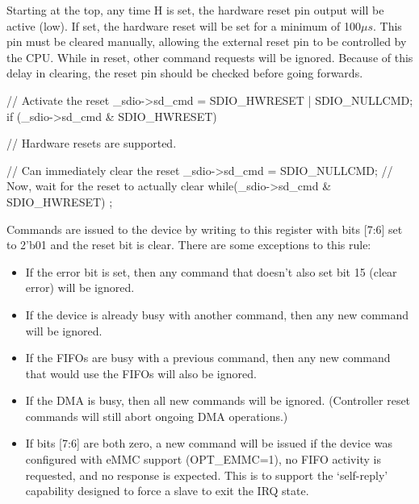 \documentclass{gqtekspec}
\begin{document}
Starting at the top, any time H is set, the hardware
reset pin output will be active (low).  If set, the hardware reset will be set
for a minimum of 100$\mu s$.  This pin must be cleared manually, allowing
the external reset pin to be controlled by the CPU.  While in reset, other
command requests will be ignored.  Because of this delay in clearing, the
reset pin should be checked before going forwards.

\begin{zCpp}
	// Activate the reset
	_sdio->sd_cmd = SDIO_HWRESET | SDIO_NULLCMD;
	if (_sdio->sd_cmd & SDIO_HWRESET) {
		// Hardware resets are supported.

		// Can immediately clear the reset
		_sdio->sd_cmd = SDIO_NULLCMD;
		// Now, wait for the reset to actually clear
		while(_sdio->sd_cmd & SDIO_HWRESET)
			;
	}
\end{zCpp}

Commands are issued to the device by writing to this register with bits [7:6]
set to 2'b01 and the reset bit is clear.  There are some exceptions to this
rule:
\begin{itemize}
\item If the error bit is set, then any command that doesn't also set bit 15
	(clear error) will be ignored.
\item If the device is already busy with another command, then any new command
	will be ignored.
\item If the FIFOs are busy with a previous command, then any new command that
	would use the FIFOs will also be ignored.
\item If the DMA is busy, then all new commands will be ignored.  (Controller
	reset commands will still abort ongoing DMA operations.)
\item If bits [7:6] are both zero, a new command will be issued if the device
	was configured with eMMC support (OPT\_EMMC=1), no FIFO activity
	is requested, and no response is expected.  This is to support the
	`self-reply' capability designed to force a slave to exit the IRQ
	state.
\end{itemize}
\end{document}
